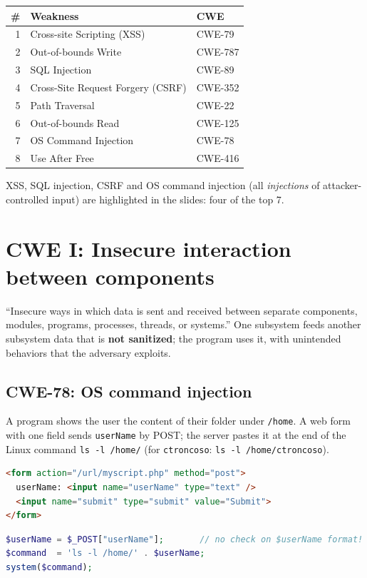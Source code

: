 \begin{exbox}[title={CWE Top 25 (current list, first 8)}]
\begin{center}
\small
\begin{tabular}{r|l|l}
\textbf{\#} & \textbf{Weakness} & \textbf{CWE} \\ \hline
1 & Cross-site Scripting (XSS) & CWE-79 \\
2 & Out-of-bounds Write & CWE-787 \\
3 & SQL Injection & CWE-89 \\
4 & Cross-Site Request Forgery (CSRF) & CWE-352 \\
5 & Path Traversal & CWE-22 \\
6 & Out-of-bounds Read & CWE-125 \\
7 & OS Command Injection & CWE-78 \\
8 & Use After Free & CWE-416
\end{tabular}
\end{center}
XSS, SQL injection, CSRF and OS command injection (all \emph{injections} of attacker-controlled
input) are highlighted in the slides: four of the top 7.
\end{exbox}

\section{CWE I: Insecure interaction between components}

\begin{defnbox}[title={Insecure interaction between components}]
``Insecure ways in which data is sent and received between separate components, modules, programs,
processes, threads, or systems.'' One subsystem feeds another subsystem data that is \textbf{not
sanitized}; the program uses it, with unintended behaviors that the adversary exploits.
\end{defnbox}

\subsection{CWE-78: OS command injection}

\begin{defnbox}[title={CWE-78: Improper Neutralization of Special Elements used in an OS Command}]
A program shows the user the content of their folder under \texttt{/home}. A web form with one field
sends \texttt{userName} by POST; the server pastes it at the end of the Linux command
\texttt{ls -l /home/} (for \texttt{ctroncoso}: \texttt{ls -l /home/ctroncoso}).
\begin{lstlisting}[language=HTML]
<form action="/url/myscript.php" method="post">
  userName: <input name="userName" type="text" />
  <input name="submit" type="submit" value="Submit">
</form>
\end{lstlisting}
\begin{lstlisting}[language=PHP]
$userName = $_POST["userName"];       // no check on $userName format!
$command  = 'ls -l /home/' . $userName;
system($command);
\end{lstlisting}
\end{defnbox}

